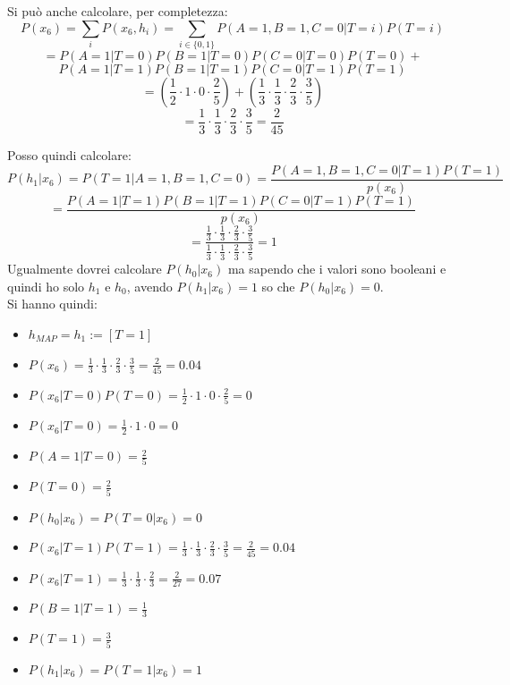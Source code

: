 \begin{esercizio}
  Si può anche calcolare, per completezza:
  \[P(x_6)=\sum_iP(x_6, h_i)=\sum_{i\in\{0, 1\}}P(A=1, B=1, C=0|T=i)P(T=i)\]
  \[= P(A=1|T=0)P(B=1|T=0)P(C=0|T=0)P(T=0)+\]
  \[P(A=1|T=1)P(B=1|T=1)P(C=0|T=1)P(T=1)\]
  \[=( \frac{1}{2}\cdot 1\cdot  0\cdot\frac{2}{5})+(\frac{1}{3}\cdot
    \frac{1}{3}\cdot \frac{2}{3}\cdot\frac{3}{5})\]
  \[=\frac{1}{3}\cdot \frac{1}{3}\cdot
    \frac{2}{3}\cdot\frac{3}{5}=\frac{2}{45}\]

  Posso quindi calcolare:
  \[P(h_1|x_6)=P(T=1|A=1, B=1, C=0)=\frac{P(A=1, B=1, C=0|T=1)P(T=1)}{p(x_6)}\]
  \[=\frac{P(A=1|T=1)P(B=1|T=1)P(C=0|T=1)P(T=1)}{p(x_6)}\]
  \[=\frac{\frac{1}{3}\cdot \frac{1}{3}\cdot
      \frac{2}{3}\cdot\frac{3}{5}}
    {\frac{1}{3}\cdot \frac{1}{3}\cdot
      \frac{2}{3}\cdot\frac{3}{5}}=1\]
  Ugualmente dovrei calcolare $P(h_0|x_6)$ ma sapendo che i valori sono booleani
  e quindi ho solo $h_1$ e $h_0$, avendo $P(h_1|x_6)=1$ so che
  $P(h_0|x_6)=0$. \\
  Si hanno quindi:
  \begin{itemize}
    \item $h_{MAP}=h_1:=[T=1]$
    \item $P(x_6)=\frac{1}{3}\cdot \frac{1}{3}\cdot
    \frac{2}{3}\cdot\frac{3}{5}=\frac{2}{45}=0.04$
    \item $P(x_6|T=0)P(T=0)= \frac{1}{2}\cdot 1\cdot  0\cdot\frac{2}{5}=0$
    \item $P(x_6|T=0)= \frac{1}{2}\cdot 1\cdot  0=0$
    \item $P(A=1|T=0)=\frac{2}{5}$
    \item $P(T=0)=\frac{2}{5}$
    \item $P(h_0|x_6)=P(T=0|x_6)=0$
    \item $P(x_6|T=1)P(T=1)=\frac{1}{3}\cdot \frac{1}{3}\cdot
    \frac{2}{3}\cdot\frac{3}{5}=\frac{2}{45}=0.04$
    \item $P(x_6|T=1)=\frac{1}{3}\cdot \frac{1}{3}\cdot
    \frac{2}{3}=\frac{2}{27}=0.07$
    \item $P(B=1|T=1)=\frac{1}{3}$
    \item $P(T=1)=\frac{3}{5}$
    \item $P(h_1|x_6)=P(T=1|x_6)=1$
  \end{itemize}
\end{esercizio}
